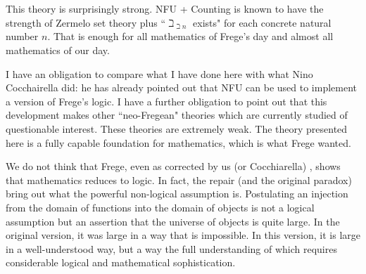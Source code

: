 \documentclass[12pt]{article}
\begin{document}
This theory is surprisingly strong.  NFU + Counting is known to have the strength of Zermelo set theory plus ``$\beth_{\beth n}$ exists" for each concrete natural number $n$.  That is enough for all mathematics of Frege's day and almost all mathematics of our day.

I have an obligation to compare what I have done here with what Nino Cocchairella did:  he has already pointed out that NFU can be used to implement a version of Frege's logic.  I have a further obligation to point out that this development makes other ``neo-Fregean" theories which are currently studied of questionable interest.  These theories are extremely weak.  The theory presented here is a fully capable foundation for mathematics, which is what Frege wanted.

We do not think that Frege, even as corrected by us (or Cocchiarella) , shows that mathematics reduces to logic.  In fact, the repair (and the original paradox) bring out what the powerful non-logical assumption is.  Postulating an injection from the domain of  functions into the domain of objects  is not a logical assumption but an assertion that the universe of objects is quite large.  In the original version, it was large in a way that is impossible.  In this version, it is large in a well-understood way, but a way the full understanding of which requires considerable logical and mathematical sophistication.
\end{document}
